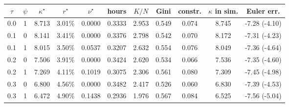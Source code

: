 \begin{tabular}{ccccccccccc}
\toprule
$\tau$ & $\psi$ & $\kappa^\star$ & $r^\star$ & $\nu^\star$ & hours & $K/N$ & Gini & constr. & $\kappa$ in sim. & Euler err.\\
\midrule
0.0 & 1 & 8.713 & 3.01\% & 0.0000 & 0.3333 & 2.953 & 0.549 & 0.074 & 8.745 & -7.28 (-4.10)\\
0.1 & 0 & 8.141 & 3.41\% & 0.0000 & 0.3376 & 2.798 & 0.542 & 0.070 & 8.172 & -7.31 (-4.23)\\
0.1 & 1 & 8.015 & 3.50\% & 0.0537 & 0.3207 & 2.632 & 0.554 & 0.076 & 8.049 & -7.36 (-4.64)\\
0.2 & 0 & 7.506 & 3.91\% & 0.0000 & 0.3424 & 2.620 & 0.534 & 0.066 & 7.536 & -7.35 (-4.60)\\
0.2 & 1 & 7.269 & 4.11\% & 0.1019 & 0.3075 & 2.306 & 0.561 & 0.080 & 7.309 & -7.45 (-4.98)\\
0.3 & 0 & 6.800 & 4.56\% & 0.0000 & 0.3482 & 2.417 & 0.526 & 0.060 & 6.830 & -7.39 (-4.53)\\
0.3 & 1 & 6.472 & 4.90\% & 0.1438 & 0.2936 & 1.976 & 0.567 & 0.084 & 6.525 & -7.56 (-5.04)\\
\bottomrule
\end{tabular}
